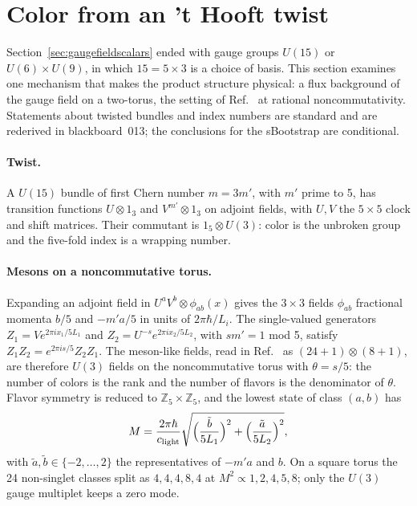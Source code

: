 \section{Color from an 't Hooft twist}
\label{sec:colortwist}
Section~\ref{sec:gaugefieldscalars} ended with gauge groups $U(15)$ or
$U(6)\times U(9)$, in which $15=5\times3$ is a choice of basis. This
section examines one mechanism that makes the product structure
physical: a flux background of the gauge field on a two-torus, the
setting of Ref.~\cite{CDS} at rational noncommutativity. Statements
about twisted bundles and index numbers are standard and are rederived
in blackboard~013; the conclusions for the sBootstrap are conditional.

\paragraph{Twist.}
A $U(15)$ bundle of first Chern number $m=3m'$, with $m'$ prime to 5,
has transition functions $U\otimes1_3$ and $V^{m'}\otimes1_3$ on adjoint
fields, with $U,V$ the $5\times5$ clock and shift matrices. Their
commutant is $1_5\otimes U(3)$: color is the unbroken group and the
five-fold index is a wrapping number.

\paragraph{Mesons on a noncommutative torus.}
Expanding an adjoint field in $U^aV^b\otimes\phi_{ab}(x)$ gives the
$3\times3$ fields $\phi_{ab}$ fractional momenta $b/5$ and $-m'a/5$ in
units of $2\pi\hbar/L_i$. The single-valued generators
$Z_1=Ve^{2\pi ix_1/5L_1}$ and $Z_2=U^{-s}e^{2\pi ix_2/5L_2}$, with
$sm'=1$ mod 5, satisfy $Z_1Z_2=e^{2\pi is/5}Z_2Z_1$. The meson-like
fields, read in Ref.~\cite{Rivero2024} as $(24+1)\otimes(8+1)$, are
therefore $U(3)$ fields on the noncommutative torus with $\theta=s/5$:
the number of colors is the rank and the number of flavors is the
denominator of $\theta$. Flavor symmetry is reduced to
$\mathbb Z_5\times\mathbb Z_5$, and the lowest state of class $(a,b)$
has
\begin{equation}
M=\frac{2\pi\hbar}{c_{\rm light}}
\sqrt{\Bigl(\frac{\tilde b}{5L_1}\Bigr)^2+\Bigl(\frac{\tilde a}{5L_2}\Bigr)^2},
\end{equation}
with $\tilde a,\tilde b\in\{-2,\dots,2\}$ the representatives of $-m'a$
and $b$. On a square torus the 24 non-singlet classes split as
$4,4,4,8,4$ at $M^2\propto1,2,4,5,8$; only the $U(3)$ gauge multiplet
keeps a zero mode.

